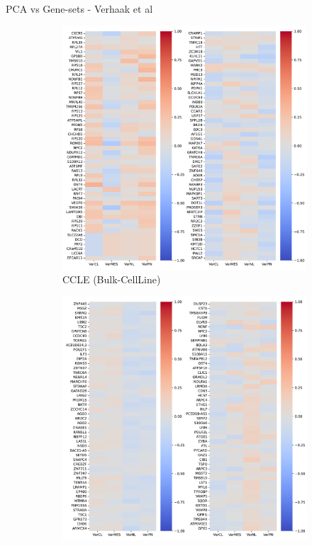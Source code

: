\documentclass[aspectratio=169,9pt]{beamer}
\begin{document}
    \begin{frame}{PCA vs Gene-sets - Verhaak et al}
        \begin{adjustwidth}{-5cm}{-5cm}
            \centering
            \begin{figure}\ContinuedFloat
                \centering
                \begin{subfigure}[c]{0.48\textwidth}
                    \centering
                    \includegraphics[width=\textwidth]{CCLE_load-corr_Ver}
                    \caption{CCLE (Bulk-CellLine)}
                \end{subfigure}
                \begin{subfigure}[c]{0.48\textwidth}
                    \centering
                    \includegraphics[width=\textwidth]{TCGA_load-corr_Ver}

\end{subfigure}
\end{figure}
\end{adjustwidth}
\end{frame}
\end{document}
